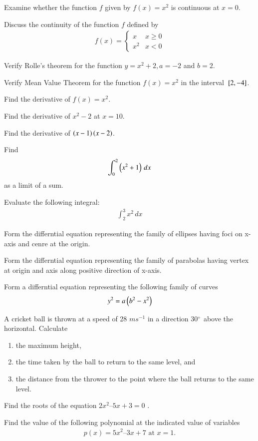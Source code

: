 %
%
\item Examine whether the function $f$ given by $f(x) = x^2$ is continuous at $x = 0$.
%
\item Discuss the continuity of the function $f$ defined by 
%
\begin{align}
f(x)  = 
\begin{cases}
x & x \ge 0
\\
x^2 & x < 0
\end{cases}
\end{align}
%
\item Verify Rolle's theorem for the function $y = x^2+2, a = -2$ and $b = 2$.
\item Verify Mean Value Theorem for the function $f(x) = x^2$ in the interval ${}\left[2,-4\right]$.
\item Find the derivative of $f(x) = x^2$.
\item Find the derivative of $ x^2 - 2$ at $x = 10$.
\item Find the derivative of $ \left(x-1\right) \left(x-2\right)$.
%
%
\item Find 
\begin{align}
\int_{0}^{2} \left(x^2+1\right)\,dx
\end{align}
%
as a limit of a sum.
\item Evaluate the following integral:
%
\begin{align}
\int_{2}^{3}x^2 \,dx
\end{align}
%
\item Form the differntial equation representing the family of ellipses having foci on x-axis and cenre at the origin.
%
\item Form the differntial equation representing the family of parabolas having vertex at origin and axis along positive direction of x-axis.
\item Form a differntial equation representing the following family of curves
%
\begin{align}
y^2 = a\left(b^2-x^2\right)
\end{align}
%
\item  A cricket ball is thrown at a speed of 28 $m s^{-1}$
in a direction 30$\degree$ above
the horizontal. Calculate 
\begin{enumerate}
\item  the maximum height, 
\item  the time taken by the ball to return to the same level, and 
\item  the distance from the thrower to the point where the ball returns to the same level.
\end{enumerate}
\item Find the roots of the equation  $2x^2– 5x + 3 = 0$ .
\item Find the value of  the following polynomial at the indicated value of variables 
\begin{align}
p(x) = 5x^2– 3x + 7 \text{  at } x = 1.
\end{align}

